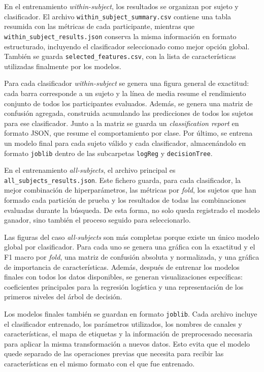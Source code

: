 En el entrenamiento \textit{within-subject}, los resultados se organizan por sujeto y clasificador. El archivo \texttt{within\_subject\_summary.csv} contiene una tabla resumida con las métricas de cada participante, mientras que \texttt{within\_subject\_results.json} conserva la misma información en formato estructurado, incluyendo el clasificador seleccionado como mejor opción global. También se guarda \texttt{selected\_features.csv}, con la lista de características utilizadas finalmente por los modelos.

Para cada clasificador \textit{within-subject} se genera una figura general de exactitud: cada barra corresponde a un sujeto y la línea de media resume el rendimiento conjunto de todos los participantes evaluados. Además, se genera una matriz de confusión agregada, construida acumulando las predicciones de todos los sujetos para ese clasificador. Junto a la matriz se guarda un \textit{classification report} en formato \ac{JSON}, que resume el comportamiento por clase. Por último, se entrena un modelo final para cada sujeto válido y cada clasificador, almacenándolo en formato \texttt{joblib} dentro de las subcarpetas \texttt{logReg} y \texttt{decisionTree}.

En el entrenamiento \textit{all-subjects}, el archivo principal es \texttt{all\_subjects\_results.json}. Este fichero guarda, para cada clasificador, la mejor combinación de hiperparámetros, las métricas por \textit{fold}, los sujetos que han formado cada partición de prueba y los resultados de todas las combinaciones evaluadas durante la búsqueda. De esta forma, no solo queda registrado el modelo ganador, sino también el proceso seguido para seleccionarlo.

Las figuras del caso \textit{all-subjects} son más completas porque existe un único modelo global por clasificador. Para cada uno se genera una gráfica con la exactitud y el F1 macro por \textit{fold}, una matriz de confusión absoluta y normalizada, y una gráfica de importancia de características. Además, después de entrenar los modelos finales con todos los datos disponibles, se generan visualizaciones específicas: coeficientes principales para la regresión logística y una representación de los primeros niveles del árbol de decisión.

Los modelos finales también se guardan en formato \texttt{joblib}. Cada archivo incluye el clasificador entrenado, los parámetros utilizados, los nombres de canales y características, el mapa de etiquetas y la información de preprocesado necesaria para aplicar la misma transformación a nuevos datos. Esto evita que el modelo quede separado de las operaciones previas que necesita para recibir las características en el mismo formato con el que fue entrenado.

